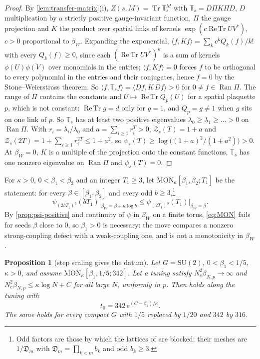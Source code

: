 \documentclass[11pt,a4paper]{amsart}
\newtheorem{proposition}[theorem]{Proposition}
\theoremstyle{definition}
\theoremstyle{remark}
\numberwithin{equation}{section}
\DeclareMathOperator{\Tr}{Tr}        %
\DeclareMathOperator{\ReTr}{Re\,Tr}  %
\newcommand{\ip}[2]{\langle #1,#2\rangle}  %
\newcommand{\SU}{\mathrm{SU}}              %
\newcommand{\TT}{\mathbb{T}}               %
\newcommand{\Zpart}[2]{Z(#1,#2)}           %
\newcommand{\Zc}{\mathcal{Z}}              %
\newcommand{\Zs}[2]{\Zc_{#1}(#2)}          %
\newcommand{\psiT}[2]{\psi_{#1}(#2)}       %
\newcommand{\cube}[1]{(2#1)^3}             %
\newcommand{\lzero}{\lambda_0}             %
\newcommand{\Mcirc}{\text{\upshape(M$^{\circ}$)}}   %
\newcommand{\tzero}{t_0}                   %
\newcommand{\betaNp}{\beta_{N,p}}          %
\newcommand{\Den}{\mathfrak D}            %
\newcommand{\betaW}{\beta_{W}}             %
\begin{document}
\begin{proof}
By \cref{lem:transfer-matrix}(i), $\Zpart sM=\Tr\TT_s^M$ with $\TT_s=D\Pi K\Pi D$, $D$ multiplication by a strictly positive gauge-invariant function, $\Pi$ the gauge projection and $K$ the product over spatial links of kernels $\exp(c\ReTr UV^*)$, $c>0$ proportional to $\betaW$. Expanding the exponential, $\ip f{Kf}=\sum_kc^kQ_k(f)/k!$ with every $Q_k(f)\ge0$, since each $(\ReTr UV^*)^k$ is a sum of kernels $\phi(U)\overline{\phi(V)}$ over monomials in the entries; $\ip f{Kf}=0$ forces $f$ to be orthogonal to every polynomial in the entries and their conjugates, hence $f=0$ by the Stone--Weierstrass theorem. So $\ip f{\TT_sf}=\ip{Df}{K\,Df}>0$ for $0\ne f\in\operatorname{Ran}\Pi$. The range of $\Pi$ contains the constants and $U\mapsto\ReTr Q_p(U)$ for a spatial plaquette $p$, which is not constant: $\ReTr g=d$ only for $g=1$, and $Q_p=g\ne1$ when $g$ sits on one link of $p$. So $\TT_s$ has at least two positive eigenvalues $\lzero\ge\lambda_1\ge\dots>0$ on $\operatorname{Ran}\Pi$. With $r_i=\lambda_i/\lzero$ and $a=\sum_{i\ge1}r_i^T>0$, $\Zs sT=1+a$ and $\Zs s{2T}=1+\sum_{i\ge1}r_i^{2T}\le1+a^2$, so $\psiT sT\ge\log\bigl((1+a)^2/(1+a^2)\bigr)>0$. At $\betaW=0$, $K$ is a multiple of the projection onto the constant functions, $\TT_s$ has one nonzero eigenvalue on $\operatorname{Ran}\Pi$ and $\psiT sT=0$.
\end{proof}

For $\kappa>0$, $0<\beta_1<\beta_2$ and an integer $T_1\ge3$, let $\mathrm{MON}_\kappa[\beta_1,\beta_2;T_1]$ be the statement: for every $\beta\in[\beta_1,\beta_2]$ and every odd $b\ge3$,\footnote{Odd factors are those by which the lattices of \cite{openaiym} are blocked: their meshes are $1/\Den_m$ with $\Den_m=\prod_{k<m}b_k$ and odd $b_k\ge3$.}
\begin{equation}\label{eq:MON}
\psiT{\cube{bT_1}}{bT_1}\Big|_{\betaW=\beta+\kappa\log b}\le\psiT{\cube{T_1}}{T_1}\Big|_{\betaW=\beta} .
\end{equation}
By \cref{prop:psi-positive} and continuity of $\psi$ in $\betaW$ on a finite torus, \eqref{eq:MON} fails for seeds $\beta$ close to $0$, so $\beta_1>0$ is necessary: the move compares a nonzero strong-coupling defect with a weak-coupling one, and is not a monotonicity in $\betaW$.

\begin{proposition}[step scaling gives the datum]\label{prop:step-scaling}
Let $G=\SU(2)$, $0<\beta_1<1/5$, $\kappa>0$, and assume $\mathrm{MON}_\kappa[\beta_1,1/5;342]$. Let a tuning satisfy $N_c^2\betaNp\to\infty$ and $N_c^2\betaNp\le\kappa\log N+C$ for all large $N$, uniformly in $p$. Then \Mcirc{} holds along the tuning with
\[
\tzero=342\,e^{(C-\beta_1)/\kappa} .
\]
The same holds for every compact $G$ with $1/5$ replaced by $1/20$ and $342$ by $316$.
\end{proposition}
\end{document}
